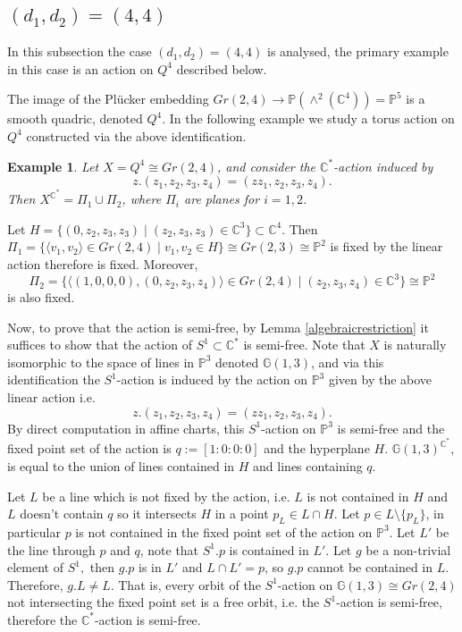 \documentclass[12pt]{article}
\newtheorem{example}[theorem]{Example}
\begin{document}
\subsection{ $(d_1,d_2) = (4,4)$}

In this subsection the case $(d_1,d_2)=(4,4)$ is analysed, the primary example in this case is an action on $Q^4$ described below.

The image of the Pl\"{u}cker embedding $Gr(2,4) \rightarrow \mathbb{P}(\wedge^2(\mathbb{C}^4)) =  \mathbb{P}^5$ is a smooth quadric, denoted $Q^4$. In the following example we study a torus action on $Q^4$ constructed via the above identification.

\begin{example} \label{quadricexample}
Let $X =Q^4 \cong   Gr(2,4)$, and consider the $\mathbb{C}^*$-action induced by $$z.(z_1,z_2,z_3,z_4) = (z z_1,z_2,z_3,z_4).$$ Then $X^{\mathbb{C}^*} = \Pi_1 \cup \Pi_2$, where $\Pi_i$ are planes for $i=1,2$.
\end{example}

Let $H = \{(0,z_2,z_3,z_3) \mid (z_2,z_3,z_3) \in \mathbb{C}^3\} \subset \mathbb{C}^4$. Then $\Pi_1=\{\langle v_1,v_2 \rangle \in  Gr(2,4) \mid v_1,v_2 \in H \} \cong Gr(2,3) \cong \mathbb{P}^2$ is fixed by the linear action therefore is fixed. Moreover, $$\Pi_{2} = \{\langle (1,0,0,0), (0,z_2,z_3,z_4 ) \rangle \in Gr(2,4) \mid (z_2,z_3,z_4 ) \in \mathbb{C}^3  \} \cong \mathbb{P}^2$$ is also fixed.

Now, to prove that the action is semi-free, by Lemma \ref{algebraicrestriction}  it suffices to show that the action of $S^1 \subset \mathbb{C}^*$ is semi-free.  Note that $X$ is naturally isomorphic to the space of lines in $\mathbb{P}^3$ denoted $\mathbb{G}(1,3)$, and via this identification the $S^1$-action is induced by the action on $\mathbb{P}^3$ given by the above linear action i.e. $$z.(z_1,z_2,z_3,z_4) = (z z_1,z_2,z_3,z_4).$$ By direct computation in affine charts, this $S^1$-action on $\mathbb{P}^3$ is semi-free and the fixed point set of the action is $q:=[1:0:0:0]$ and the hyperplane $H$. $\mathbb{G}(1,3)^{\mathbb{C}^*}$, is equal to the union of lines contained in $H$ and lines containing $q$.

 Let $L$ be a line which is not fixed by the action, i.e. $L$ is not contained in $H$  and $L$ doesn't contain $q$ so it intersects  $H$ in a point $p_{L} \in L \cap H$. Let $p \in L \setminus \{p_{L}\} $, in particular $p$ is not contained in the fixed point set of the action on $\mathbb{P}^3$. Let $L'$ be the line through $p$ and $q$, note that $S^1.p$ is contained in $L'$. Let $g$ be a non-trivial element of $S^1,$ then $g.p$ is in $L'$ and $L \cap L' = p$, so $g.p$ cannot be contained in $L$. Therefore, $g.L \neq L$. That is, every orbit of the $S^1$-action on $\mathbb{G}(1,3) \cong Gr(2,4)$ not intersecting the fixed point set is a free orbit, i.e. the $S^1$-action is semi-free, therefore the $\mathbb{C}^*$-action is semi-free.
\end{document}

